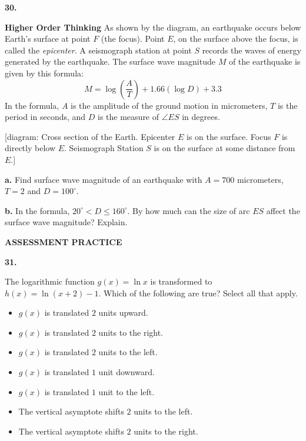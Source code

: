 \documentclass{article}
\newenvironment{practice}[2]{\textbf{#1.}\par}{\par}
\newcommand{\answer}[1]{}
\newcommand{\placeholder}[2]{[#1: #2]}
\begin{document}
\begin{practice}{30}{}
\textbf{Higher Order Thinking} As shown by the diagram, an earthquake occurs below Earth's surface at point $F$ (the focus). Point $E$, on the surface above the focus, is called the \textit{epicenter}. A seismograph station at point $S$ records the waves of energy generated by the earthquake. The surface wave magnitude $M$ of the earthquake is given by this formula:
$$M = \log\left(\frac{A}{T}\right) + 1.66(\log D) + 3.3$$
In the formula, $A$ is the amplitude of the ground motion in micrometers, $T$ is the period in seconds, and $D$ is the measure of $\angle ES$ in degrees.

\placeholder{diagram}{Cross section of the Earth. Epicenter $E$ is on the surface. Focus $F$ is directly below $E$. Seismograph Station $S$ is on the surface at some distance from $E$.}

\textbf{a.} Find surface wave magnitude of an earthquake with $A = 700$ micrometers, $T = 2$ and $D = 100^\circ$.

\textbf{b.} In the formula, $20^\circ < D \leq 160^\circ$. By how much can the size of arc $ES$ affect the surface wave magnitude? Explain.
\answer{}
\end{practice}

\vspace{1em}
\textbf{ASSESSMENT PRACTICE}

\begin{practice}{31}{}
The logarithmic function $g(x) = \ln x$ is transformed to $h(x) = \ln(x + 2) - 1$. Which of the following are true? Select all that apply.
\begin{itemize}
    \item[$\square$] $g(x)$ is translated $2$ units upward.
    \item[$\square$] $g(x)$ is translated $2$ units to the right.
    \item[$\square$] $g(x)$ is translated $2$ units to the left.
    \item[$\square$] $g(x)$ is translated $1$ unit downward.
    \item[$\square$] $g(x)$ is translated $1$ unit to the left.
    \item[$\square$] The vertical asymptote shifts $2$ units to the left.
    \item[$\square$] The vertical asymptote shifts $2$ units to the right.
\end{itemize}
\answer{}
\end{practice}
\end{document}
